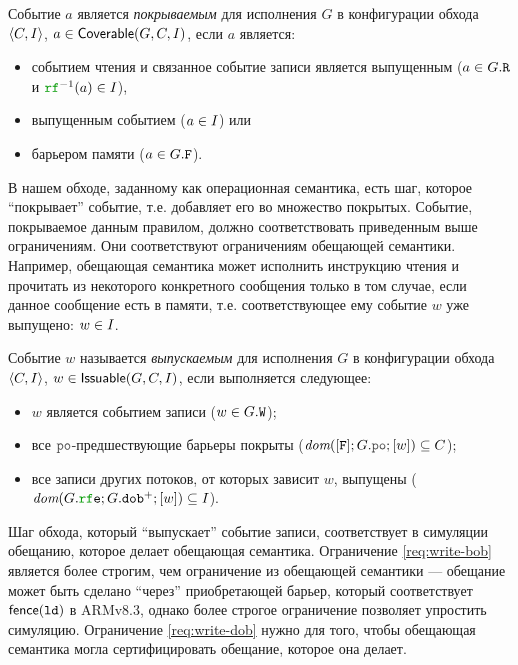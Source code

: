 \begin{definition}
Событие $a$ является \emph{покрываемым} для исполнения $G$ в конфигурации обхода ${\langle{C, I}\rangle}$,
$a\in {\sf Coverable}(G, C, I)$, если $a$ является:
  \begin{itemize}
    \item событием чтения и связанное событие записи является выпущенным ($a \in G.{\mathtt{R}}$ и $\lRF^{-1}(a) \in \IssuedSet$),
    \item выпущенным событием ($a \in I$) или
    \item барьером памяти ($a \in G.{\mathtt{F}}$).
  \end{itemize}
\end{definition}
В нашем обходе, заданному как операционная семантика, есть шаг, которое ``покрывает'' событие, т.е. добавляет
его во множество покрытых. Событие, покрываемое данным правилом, должно соответствовать приведенным выше ограничениям.
Они соответствуют ограничениям обещающей семантики. Например, обещающая семантика может исполнить
инструкцию чтения и прочитать из некоторого конкретного сообщения только в том случае, если данное сообщение есть в памяти,
т.е. соответствующее ему событие $w$ уже выпущено: $w \in I$.

\begin{definition}
Событие $w$ называется \emph{выпускаемым} для исполнения $G$ в конфигурации обхода ${\langle{C, I}\rangle}$,
$w\in{\sf Issuable}(G, C, I)$, если выполняется следующее:
      \begin{itemize}
        \item $w$ является событием записи ($w\in G.{\mathtt{W}}$);
        \item все $\lPO$-предшествующие барьеры покрыты
          ($\dom{[\lF];G.\lPO;[w]} \suq C$);
        \item все записи других потоков, от которых зависит $w$, выпущены
          ($\dom{G.\lRFE;G.\lDOB^{+};[w]} \suq \IssuedSet$).
      \end{itemize}
\end{definition}
Шаг обхода, который ``выпускает'' событие записи, соответствует в симуляции обещанию, которое делает обещающая семантика.
Ограничение \ref{req:write-bob} является более строгим, чем ограничение из обещающей семантики ---
обещание может быть сделано ``через'' приобретающей барьер, который соответствует $\mathsf{fence}({\mathtt{ld}})$ в ARMv8.3,
однако более строгое ограничение позволяет упростить симуляцию.
Ограничение \ref{req:write-dob} нужно для того, чтобы обещающая семантика могла сертифицировать обещание, которое она
делает.

